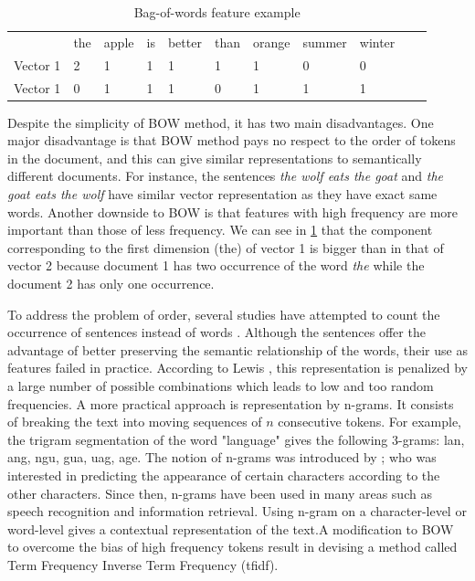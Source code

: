 \begin{table}
\centering
\caption {Bag-of-words feature example}
\begin{tabular}{l|l|l|l|l|l|l|l|l|l|l}
 & the & apple & is & better & than & orange & summer & winter \\
Vector 1 & 2 & 1 & 1 & 1 & 1 & 1 & 0 & 0 \\
Vector 1 & 0 & 1 & 1 & 1 & 0 & 1 & 1 & 1 \\
\end{tabular}
\label {tb:bow}
\end{table}


Despite the simplicity of BOW method,  it has two main disadvantages. One major disadvantage is that BOW method pays no respect to the order of tokens in the document, and this can give similar representations to semantically different documents. For instance, the sentences \emph{the wolf eats the goat} and \emph{the goat eats the wolf} have similar vector representation as they have exact same words. Another downside to BOW is that features with high frequency are more important than those of less frequency. We can see in \ref{tb:bow} that the component corresponding to the first dimension (the) of vector 1 is bigger than in that of vector 2 because document 1 has two occurrence of the word \emph{the} while the document 2 has only one occurrence. 

To address the problem of order, several studies have attempted to count the occurrence of sentences instead of words \citep{fuhr1991probabilistic} \citep{tzeras1993automatic}. Although the sentences offer the advantage of better preserving the semantic relationship of the words, their use as features failed in practice. According to Lewis \citep{lewis1992representation}, this representation is penalized by a large number of possible combinations which leads to low and too
random frequencies. A more practical approach is representation by n-grams. It consists of breaking the text into moving sequences of $n$ consecutive tokens. For example, the trigram segmentation of the word "language" gives the following 3-grams: lan, ang, ngu, gua, uag, age. The notion of n-grams was introduced by  \citep{shannon1948mathematical}; who was interested in predicting the appearance of certain characters according to the other characters. Since then, n-grams have been used in many areas such as speech recognition and information retrieval. Using n-gram on a character-level or word-level gives a contextual representation of the text.A modification to BOW to overcome the bias of high frequency tokens result in devising a method called Term Frequency Inverse Term Frequency (tfidf). 


